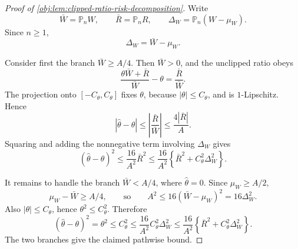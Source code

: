 \begin{proof}[Proof of \cref{obj:lem:clipped-ratio-risk-decomposition}]
Write
\[
\bar W=\mathbb P_n W,\qquad
\bar R=\mathbb P_n R,\qquad
\Delta_W=\mathbb P_n(W-\mu_W).
\]
Since \(n\ge1\),
\[
\Delta_W=\bar W-\mu_W.
\]

Consider first the branch \(\bar W\ge A/4\). Then \(\bar W>0\), and the
unclipped ratio obeys
\[
\frac{\theta\bar W+\bar R}{\bar W}-\theta=\frac{\bar R}{\bar W}.
\]
The projection onto \([-C_\theta,C_\theta]\) fixes \(\theta\), because
\(|\theta|\le C_\theta\), and is \(1\)-Lipschitz. Hence
\[
|\widehat\theta-\theta|
\le
\left|\frac{\bar R}{\bar W}\right|
\le
\frac{4|\bar R|}{A}.
\]
Squaring and adding the nonnegative term involving \(\Delta_W\) gives
\[
(\widehat\theta-\theta)^2
\le
\frac{16}{A^2}\bar R^2
\le
\frac{16}{A^2}
\left\{\bar R^2+C_\theta^2\Delta_W^2\right\}.
\]

It remains to handle the branch \(\bar W<A/4\), where \(\widehat\theta=0\).
Since \(\mu_W\ge A/2\),
\[
\mu_W-\bar W\ge A/4,
\qquad\text{so}\qquad
A^2\le16(\bar W-\mu_W)^2=16\Delta_W^2.
\]
Also \(|\theta|\le C_\theta\), hence \(\theta^2\le C_\theta^2\). Therefore
\[
(\widehat\theta-\theta)^2
=
\theta^2
\le
C_\theta^2
\le
\frac{16}{A^2}C_\theta^2\Delta_W^2
\le
\frac{16}{A^2}\left\{\bar R^2+C_\theta^2\Delta_W^2\right\}.
\]
The two branches give the claimed pathwise bound. %
\end{proof}
